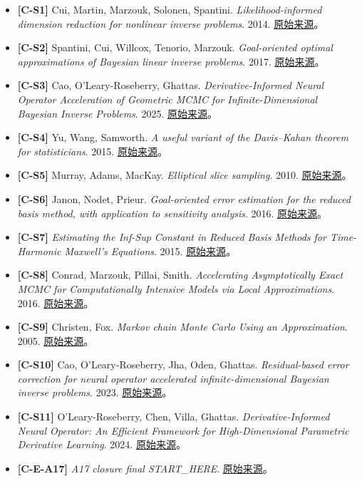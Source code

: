 \documentclass[
  11pt,
  a4paper,
]{article}
\providecommand{\tightlist}{%
  \setlength{\itemsep}{0pt}\setlength{\parskip}{0pt}}
\begin{document}
\begin{itemize}
\tightlist
\item
  \textbf{{[}C-S1{]}} Cui, Martin, Marzouk, Solonen, Spantini.
  \emph{Likelihood-informed dimension reduction for nonlinear inverse
  problems}. 2014. \href{https://arxiv.org/abs/1403.4680}{原始来源}。
\item
  \textbf{{[}C-S2{]}} Spantini, Cui, Willcox, Tenorio, Marzouk.
  \emph{Goal-oriented optimal approximations of Bayesian linear inverse
  problems}. 2017. \href{https://arxiv.org/abs/1607.01881}{原始来源}。
\item
  \textbf{{[}C-S3{]}} Cao, O'Leary-Roseberry, Ghattas.
  \emph{Derivative-Informed Neural Operator Acceleration of Geometric
  MCMC for Infinite-Dimensional Bayesian Inverse Problems}. 2025.
  \href{https://jmlr.org/papers/v26/24-0745.html}{原始来源}。
\item
  \textbf{{[}C-S4{]}} Yu, Wang, Samworth. \emph{A useful variant of the
  Davis--Kahan theorem for statisticians}. 2015.
  \href{https://arxiv.org/abs/1405.0680}{原始来源}。
\item
  \textbf{{[}C-S5{]}} Murray, Adams, MacKay. \emph{Elliptical slice
  sampling}. 2010.
  \href{https://proceedings.mlr.press/v9/murray10a.html}{原始来源}。
\item
  \textbf{{[}C-S6{]}} Janon, Nodet, Prieur. \emph{Goal-oriented error
  estimation for the reduced basis method, with application to
  sensitivity analysis}. 2016.
  \href{https://arxiv.org/abs/1303.6618}{原始来源}。
\item
  \textbf{{[}C-S7{]}} \emph{Estimating the Inf-Sup Constant in Reduced
  Basis Methods for Time-Harmonic Maxwell's Equations}. 2015.
  \href{https://ieeexplore.ieee.org/document/7254247}{原始来源}。
\item
  \textbf{{[}C-S8{]}} Conrad, Marzouk, Pillai, Smith. \emph{Accelerating
  Asymptotically Exact MCMC for Computationally Intensive Models via
  Local Approximations}. 2016.
  \href{https://arxiv.org/abs/1402.1694}{原始来源}。
\item
  \textbf{{[}C-S9{]}} Christen, Fox. \emph{Markov chain Monte Carlo
  Using an Approximation}. 2005.
  \href{https://www.tandfonline.com/doi/abs/10.1198/106186005X76983}{原始来源}。
\item
  \textbf{{[}C-S10{]}} Cao, O'Leary-Roseberry, Jha, Oden, Ghattas.
  \emph{Residual-based error correction for neural operator accelerated
  infinite-dimensional Bayesian inverse problems}. 2023.
  \href{https://arxiv.org/abs/2210.03008}{原始来源}。
\item
  \textbf{{[}C-S11{]}} O'Leary-Roseberry, Chen, Villa, Ghattas.
  \emph{Derivative-Informed Neural Operator: An Efficient Framework for
  High-Dimensional Parametric Derivative Learning}. 2024.
  \href{https://arxiv.org/abs/2206.10745}{原始来源}。
\item
  \textbf{{[}C-E-A17{]}} \emph{A17 closure final START\_\allowbreak{}HERE}.
  \href{https://github.com/migodam/a17-maxwell-certified-exchange/blob/main/closure_final/START_HERE.md}{原始来源}。
\end{itemize}
\end{document}
